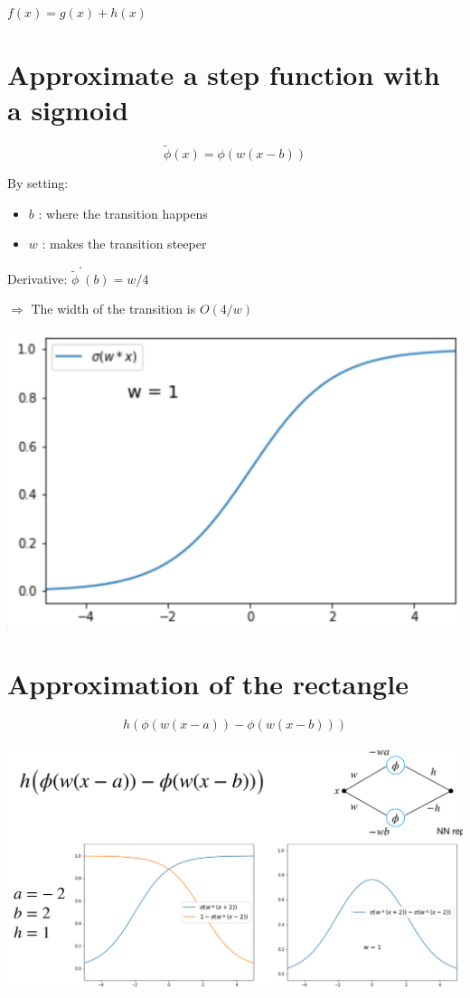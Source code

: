 \documentclass[10pt]{article}
\begin{document}
$f(x)=g(x)+h(x)$

\section*{Approximate a step function with a sigmoid}
$$
\tilde{\phi}(x)=\phi(w(x-b))
$$

By setting:

\begin{itemize}
  \item $b$ : where the transition happens
  \item $w$ : makes the transition steeper
\end{itemize}

Derivative: $\tilde{\phi}^{\prime}(b)=w / 4$

$\Rightarrow$ The width of the transition is $O(4 / w)$

\begin{center}
\includegraphics[max width=\textwidth]{2024_01_08_0e0dcffe4bc8c6049046g-24}
\end{center}

\section*{Approximation of the rectangle}
$$
h(\phi(w(x-a))-\phi(w(x-b)))
$$

\begin{center}
\includegraphics[max width=\textwidth]{2024_01_08_0e0dcffe4bc8c6049046g-25}
\end{center}
\end{document}
